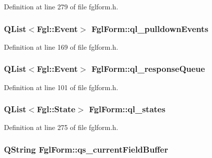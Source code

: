 Definition at line 279 of file fglform.h.

\hypertarget{classFglForm_a14b1e58865612b4ebbfa83c8769f9353}{
\subsubsection[{ql\_\-pulldownEvents}]{\setlength{\rightskip}{0pt plus 5cm}QList$<${\bf Fgl::Event}$>$ {\bf FglForm::ql\_\-pulldownEvents}}}
\label{classFglForm_a14b1e58865612b4ebbfa83c8769f9353}


Definition at line 169 of file fglform.h.

\hypertarget{classFglForm_a3aa184c0556d81cfb244f726d95b0538}{
\subsubsection[{ql\_\-responseQueue}]{\setlength{\rightskip}{0pt plus 5cm}QList$<${\bf Fgl::Event}$>$ {\bf FglForm::ql\_\-responseQueue}}}
\label{classFglForm_a3aa184c0556d81cfb244f726d95b0538}


Definition at line 101 of file fglform.h.

\hypertarget{classFglForm_a18774054d5c9773a7075b5933b0bbc9a}{
\subsubsection[{ql\_\-states}]{\setlength{\rightskip}{0pt plus 5cm}QList$<${\bf Fgl::State}$>$ {\bf FglForm::ql\_\-states}}}
\label{classFglForm_a18774054d5c9773a7075b5933b0bbc9a}


Definition at line 275 of file fglform.h.

\hypertarget{classFglForm_a04725912842355fc88fa7412e435f4a9}{
\subsubsection[{qs\_\-currentFieldBuffer}]{\setlength{\rightskip}{0pt plus 5cm}QString {\bf FglForm::qs\_\-currentFieldBuffer}}}
\label{classFglForm_a04725912842355fc88fa7412e435f4a9}


